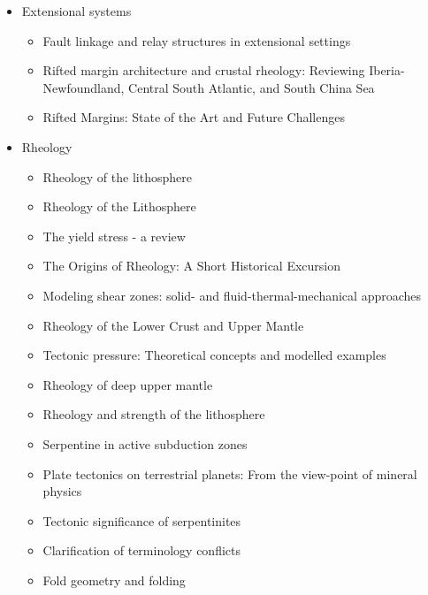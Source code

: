 \begin{itemize}
\item Extensional systems
   \begin{itemize}
   \item [\twothousandsixteen] Fault linkage and relay structures in extensional settings \cite{foro16}
   \item [\twothousandseventeen] Rifted margin architecture and crustal rheology: Reviewing 
                Iberia-Newfoundland, Central South Atlantic, and South China Sea \cite{brhc17}
   \item [\twothousandnineteen] Rifted Margins: State of the Art and Future Challenges \cite{pema19}\\
   \end{itemize}

\item Rheology 
   \begin{itemize}
   \item [\nineteeneightythree] Rheology of the lithosphere \cite{kirb83}
   \item [\nineteeneightyseven] Rheology of the Lithosphere \cite{kikr87} \cite{ramu87}
   \item [\nineteenninetynine] The yield stress - a review \cite{barn99}
   \item [\twothousandtwo] The Origins of Rheology: A Short Historical Excursion \cite{dora02}
   \item [\twothousandthree] Modeling shear zones: solid- and fluid-thermal-mechanical approaches \cite{reyu03}
   \item [\twothousandeight] Rheology of the Lower Crust and Upper Mantle \cite{budr08}
   \item [\twothousandeight] Tectonic pressure: Theoretical concepts and modelled examples \cite{manc08}
   \item [\twothousandten] Rheology of deep upper mantle \cite{kara10}
   \item [\twothousandeleven] Rheology and strength of the lithosphere \cite{buro11}
   \item [\twothousandtwelve] Serpentine in active subduction zones \cite{reyn12}
   \item [\twothousandfourteen] Plate tectonics on terrestrial planets: From the view-point of mineral physics \cite{kara14}
   \item [\twothousandfifteen] Tectonic significance of serpentinites \cite{gusr15}
   \item [\twothousandtwentyone] Clarification of terminology conflicts \cite{wang21} 
   \item [\twothousandtwentyone] Fold geometry and folding \cite{nafo21} 
   \end{itemize}


\end{itemize}
